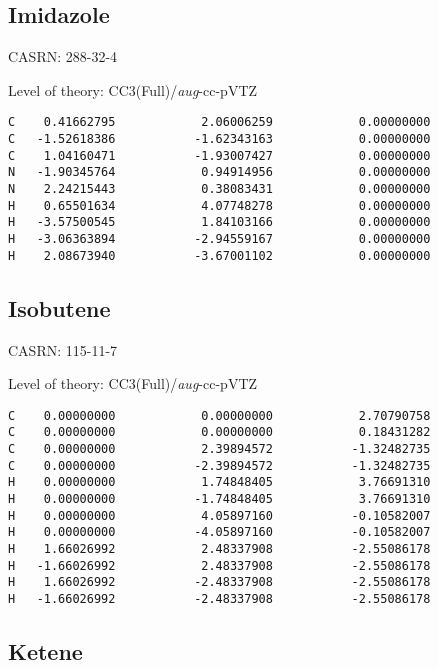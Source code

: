 \documentclass[journal=jctcce,manuscript=article,layout=traditional]{achemso}
\newcommand{\AVTZ}{\emph{aug}-cc-pVTZ}
\begin{document}
\subsection{Imidazole}

CASRN: 288-32-4

\begin{singlespace}
\noindent Level of theory: CC3(Full)/{\AVTZ}
\begin{verbatim}
C    0.41662795            2.06006259            0.00000000
C   -1.52618386           -1.62343163            0.00000000  
C    1.04160471           -1.93007427            0.00000000
N   -1.90345764            0.94914956            0.00000000
N    2.24215443            0.38083431            0.00000000  
H    0.65501634            4.07748278            0.00000000 
H   -3.57500545            1.84103166            0.00000000  
H   -3.06363894           -2.94559167            0.00000000 
H    2.08673940           -3.67001102            0.00000000 
\end{verbatim}
\end{singlespace}

\subsection{Isobutene}

CASRN: 115-11-7

\begin{singlespace}
\noindent   Level of theory: CC3(Full)/{\AVTZ}
\begin{verbatim}
C    0.00000000            0.00000000            2.70790758
C    0.00000000            0.00000000            0.18431282
C    0.00000000            2.39894572           -1.32482735
C    0.00000000           -2.39894572           -1.32482735
H    0.00000000            1.74848405            3.76691310
H    0.00000000           -1.74848405            3.76691310
H    0.00000000            4.05897160           -0.10582007
H    0.00000000           -4.05897160           -0.10582007
H    1.66026992            2.48337908           -2.55086178
H   -1.66026992            2.48337908           -2.55086178
H    1.66026992           -2.48337908           -2.55086178
H   -1.66026992           -2.48337908           -2.55086178
\end{verbatim}
\end{singlespace}

\subsection{Ketene}
\end{document}
